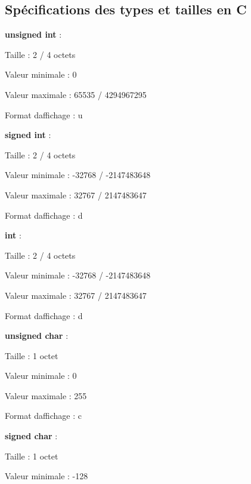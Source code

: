 \subsection*{Spécifications des types et tailles en C}


\begin{DoxyItemize}
\item {\bfseries unsigned int} \+:
\begin{DoxyItemize}
\item Taille \+: 2 / 4 octets
\item Valeur minimale \+: 0
\item Valeur maximale \+: 65535 / 4294967295
\item Format d\textquotesingle{}affichage \+: {\ttfamily u}
\end{DoxyItemize}
\item {\bfseries signed int} \+:
\begin{DoxyItemize}
\item Taille \+: 2 / 4 octets
\item Valeur minimale \+: -\/32768 / -\/2147483648
\item Valeur maximale \+: 32767 / 2147483647
\item Format d\textquotesingle{}affichage \+: {\ttfamily d}
\end{DoxyItemize}
\item {\bfseries int} \+:
\begin{DoxyItemize}
\item Taille \+: 2 / 4 octets
\item Valeur minimale \+: -\/32768 / -\/2147483648
\item Valeur maximale \+: 32767 / 2147483647
\item Format d\textquotesingle{}affichage \+: {\ttfamily d}
\end{DoxyItemize}
\item {\bfseries unsigned char} \+:
\begin{DoxyItemize}
\item Taille \+: 1 octet
\item Valeur minimale \+: 0
\item Valeur maximale \+: 255
\item Format d\textquotesingle{}affichage \+: {\ttfamily c}
\end{DoxyItemize}
\item {\bfseries signed char} \+:
\begin{DoxyItemize}
\item Taille \+: 1 octet
\item Valeur minimale \+: -\/128

\end{DoxyItemize}
\end{DoxyItemize}
